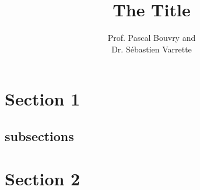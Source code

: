 \documentclass{article}
\title{The Title}
\author{%
  Prof. Pascal Bouvry and\\
  Dr. S\'ebastien Varrette
}
\begin{document}
\coverpages




\section{Section 1}

\lipsum[1]

\subsection{subsections}

\lipsum[2]

\section{Section 2}

\begin{tcolorbox}
  \lipsum[3]
\end{tcolorbox}
\end{document}
